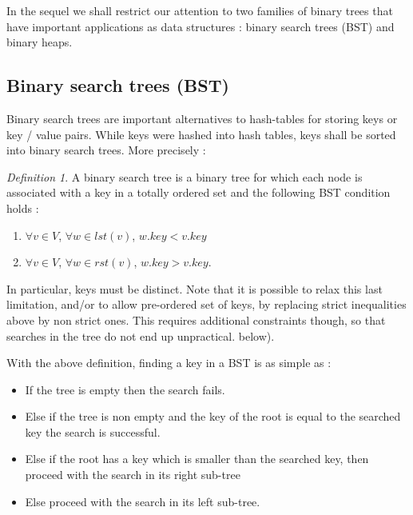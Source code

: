 \documentclass[12pt]{article}
\theoremstyle{plain}
\theoremstyle{remark}
\newtheorem*{definition}{Definition}
\begin{document}
In the sequel we shall restrict our attention to two families of binary trees
that have important applications as data structures : binary search trees (BST)
and binary heaps.

\subsection{Binary search trees (BST)}\label{subsec:bst}

Binary search trees are important alternatives to hash-tables for storing keys
or key / value pairs. While keys were hashed into hash tables, keys shall be sorted
into binary search trees. More precisely : 

\begin{definition} 
A binary search tree is a binary tree for which each node is associated with a key
in a totally ordered set and the following BST condition holds : 
	\begin{enumerate}
		\item $\forall v \in V$, $\forall w \in lst(v)$, $w.key < 
			v.key$
		\item $\forall v \in V$, $\forall w \in rst(v)$, $w.key > 
			v.key$.
	\end{enumerate}
\end{definition}

In particular, keys must be distinct. Note that it is possible to relax this last
limitation, and/or to allow pre-ordered set of keys, by replacing strict
inequalities above by non strict ones. This requires additional constraints though, 
so that searches in the tree do not end up unpractical.
below).  

\medskip

With the above definition, finding a key in a BST is as simple as :

\begin{itemize}
	\item If the tree is empty then the search fails.
	\item Else if the tree is non empty and the key of the root is equal to 
		the searched key the search is successful.
	\item Else if the root has a key which is smaller than the searched key, then
		proceed with the search in its right sub-tree
	\item Else proceed with the search in its left sub-tree.
\end{itemize}
\end{document}
